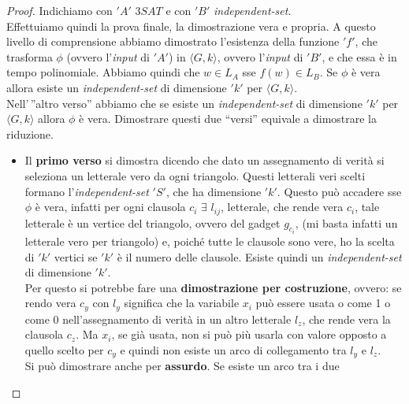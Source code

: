 							\begin{proof}
								Indichiamo con $ 'A' $ $3SAT$ e con $ 'B' $ \textit{independent-set}.\\
								Effettuiamo quindi la prova finale, la dimostrazione vera e propria. A
								questo livello di comprensione abbiamo dimostrato
								l'esistenza della funzione $ 'f' $, che trasforma $\phi$ (ovvero l'\textit{input} di $ 'A' $)
								in $\langle G, k\rangle$, ovvero l'\textit{input} di $ 'B' $, e che essa è in tempo
								polinomiale. Abbiamo quindi che $w\in L_A$ sse $f(w)\in L_B$. Se $\phi$ è
								vera allora esiste un \textit{independent-set} di dimensione $ 'k' $ per
								$\langle G, k\rangle$.\\ 
								Nell'\,''altro verso'' abbiamo che se esiste un \textit{independent-set} di
								dimensione $ 'k' $ per $\langle G, k\rangle$ allora $\phi$ è vera. Dimostrare
								questi due ``versi'' equivale a dimostrare la riduzione.\\
								\begin{itemize}
									\item 
									      Il \textbf{primo verso} si dimostra dicendo che dato un assegnamento di
									      verità si seleziona un letterale vero da ogni triangolo. Questi letterali
									      veri scelti formano l'\textit{independent-set} $ 'S' $, che ha dimensione
									      $ 'k' $. Questo può accadere sse $\phi$ è vera, infatti per ogni clausola $c_i$
									      $\exists \,\,l_{ij}$, letterale, che rende vera $c_i$,  tale
									      letterale è un vertice del triangolo, ovvero del gadget $g_{c_i}$, (mi basta
									      infatti un letterale vero per triangolo) e, poiché
									      tutte le clausole sono vere, ho la scelta di $ 'k' $ vertici se $ 'k' $ è il numero
									      delle clausole. Esiste quindi un \textit{independent-set} di dimensione
									      $ 'k' $.\\
									      Per questo si potrebbe fare una \textbf{dimostrazione per costruzione},
									      ovvero: se rendo vera $c_y$ con $l_y$ significa che la variabile $x_i$ può
									      essere usata o come 1 o come 0 nell'assegnamento di verità in un altro
									      letterale $l_z$, che rende vera la clausola $c_z$. Ma $x_i$, se già usata,
									      non si può più usarla con valore opposto a quello scelto per $c_y$ e quindi
									      non esiste un arco di collegamento tra $l_y$ e $l_z$.\\
									      Si può dimostrare anche per \textbf{assurdo}. Se esiste un arco tra i due

\end{itemize}
\end{proof}
